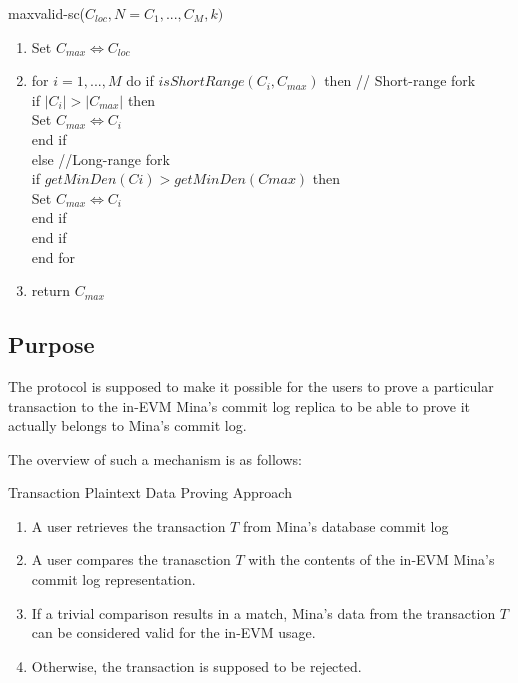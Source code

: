 \begin{algorithm}[H]
    \caption{maxvalid-sc($C_{loc}, N = {C_1, ... , C_M}, k)$}
    \begin{enumerate}
        // Compare $C_{loc}$ with each candidate chain in N
        \item Set $C_{max} \Leftrightarrow C_{loc}$
        \item for $i = 1, ... , M$ do
            if $isShortRange(C_i, C_{max})$ then // Short-range fork\\
            if $|C_i| > |C_{max}|$ then \\
            Set $C_{max} \Leftrightarrow C_{i}$ \\
            end if\\
            else //Long-range fork\\
            if $getMinDen(C𝑖) > getMinDen(Cmax)$ then \\
            Set $C_{max} \Leftrightarrow C_{i}$ \\
            end if \\
            end if \\
            end for \\
        \item return $C_{max}$
    \end{enumerate}
\end{algorithm}

\subsection{Purpose}

The protocol is supposed to make it possible for the users to prove a particular
transaction to the in-EVM Mina's commit log replica to be able to prove it
actually belongs to Mina's commit log.

The overview of such a mechanism is as follows:

\begin{algorithm}[H]
    \caption{Transaction Plaintext Data Proving Approach}
    \label{commitlog}
    \begin{enumerate}
        \item A user retrieves the transaction $T$ from Mina's database commit log
        \item A user compares the tranasction $T$ with the contents of the
            in-EVM Mina's commit log representation.
        \item If a trivial comparison results in a match, Mina's data from the
            transaction $T$ can be considered valid for the in-EVM usage.
        \item Otherwise, the transaction is supposed to be rejected.
    \end{enumerate}
\end{algorithm}
